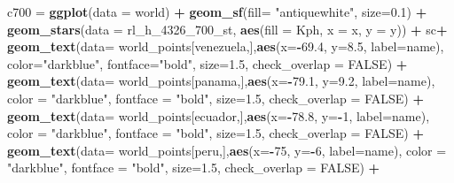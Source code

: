 \documentclass[12pt,oneside]{reedthesis}
\newenvironment{Shaded}{\begin{snugshade}}{\end{snugshade}}
\newcommand{\DataTypeTok}[1]{\textcolor[rgb]{0.13,0.29,0.53}{#1}}
\newcommand{\DecValTok}[1]{\textcolor[rgb]{0.00,0.00,0.81}{#1}}
\newcommand{\FloatTok}[1]{\textcolor[rgb]{0.00,0.00,0.81}{#1}}
\newcommand{\KeywordTok}[1]{\textcolor[rgb]{0.13,0.29,0.53}{\textbf{#1}}}
\newcommand{\NormalTok}[1]{#1}
\newcommand{\OperatorTok}[1]{\textcolor[rgb]{0.81,0.36,0.00}{\textbf{#1}}}
\newcommand{\OtherTok}[1]{\textcolor[rgb]{0.56,0.35,0.01}{#1}}
\newcommand{\StringTok}[1]{\textcolor[rgb]{0.31,0.60,0.02}{#1}}
\begin{document}
\begin{Shaded}
\begin{Highlighting}[]
\NormalTok{c700 =}\StringTok{ }\KeywordTok{ggplot}\NormalTok{(}\DataTypeTok{data =}\NormalTok{ world) }\OperatorTok{+}\StringTok{ }
\StringTok{  }\KeywordTok{geom_sf}\NormalTok{(}\DataTypeTok{fill=} \StringTok{"antiquewhite"}\NormalTok{, }\DataTypeTok{size=}\FloatTok{0.1}\NormalTok{) }\OperatorTok{+}\StringTok{ }
\StringTok{  }\KeywordTok{geom_stars}\NormalTok{(}\DataTypeTok{data =}\NormalTok{ rl_h_}\DecValTok{4326}\NormalTok{_}\DecValTok{700}\NormalTok{_st, }\KeywordTok{aes}\NormalTok{(}\DataTypeTok{fill =}\NormalTok{ Kph, }\DataTypeTok{x =}\NormalTok{ x, }\DataTypeTok{y =}\NormalTok{ y)) }\OperatorTok{+}\StringTok{ }
\StringTok{  }\NormalTok{sc}\OperatorTok{+}
\StringTok{  }\KeywordTok{geom_text}\NormalTok{(}\DataTypeTok{data=}\NormalTok{ world_points[venezuela,],}\KeywordTok{aes}\NormalTok{(}\DataTypeTok{x=}\OperatorTok{-}\FloatTok{69.4}\NormalTok{, }\DataTypeTok{y=}\FloatTok{8.5}\NormalTok{, }\DataTypeTok{label=}\NormalTok{name), }\DataTypeTok{color=}\StringTok{"darkblue"}\NormalTok{, }\DataTypeTok{fontface=}\StringTok{"bold"}\NormalTok{, }\DataTypeTok{size=}\FloatTok{1.5}\NormalTok{, }\DataTypeTok{check_overlap =} \OtherTok{FALSE}\NormalTok{) }\OperatorTok{+}
\StringTok{  }\KeywordTok{geom_text}\NormalTok{(}\DataTypeTok{data=}\NormalTok{ world_points[panama,],}\KeywordTok{aes}\NormalTok{(}\DataTypeTok{x=}\OperatorTok{-}\FloatTok{79.1}\NormalTok{, }\DataTypeTok{y=}\FloatTok{9.2}\NormalTok{, }\DataTypeTok{label=}\NormalTok{name), }\DataTypeTok{color =} \StringTok{"darkblue"}\NormalTok{, }\DataTypeTok{fontface =} \StringTok{"bold"}\NormalTok{, }\DataTypeTok{size=}\FloatTok{1.5}\NormalTok{, }\DataTypeTok{check_overlap =} \OtherTok{FALSE}\NormalTok{) }\OperatorTok{+}\StringTok{ }
\StringTok{  }\KeywordTok{geom_text}\NormalTok{(}\DataTypeTok{data=}\NormalTok{ world_points[ecuador,],}\KeywordTok{aes}\NormalTok{(}\DataTypeTok{x=}\OperatorTok{-}\FloatTok{78.8}\NormalTok{, }\DataTypeTok{y=}\OperatorTok{-}\DecValTok{1}\NormalTok{, }\DataTypeTok{label=}\NormalTok{name), }\DataTypeTok{color =} \StringTok{"darkblue"}\NormalTok{, }\DataTypeTok{fontface =} \StringTok{"bold"}\NormalTok{, }\DataTypeTok{size=}\FloatTok{1.5}\NormalTok{, }\DataTypeTok{check_overlap =} \OtherTok{FALSE}\NormalTok{) }\OperatorTok{+}
\StringTok{  }\KeywordTok{geom_text}\NormalTok{(}\DataTypeTok{data=}\NormalTok{ world_points[peru,],}\KeywordTok{aes}\NormalTok{(}\DataTypeTok{x=}\OperatorTok{-}\DecValTok{75}\NormalTok{, }\DataTypeTok{y=}\OperatorTok{-}\DecValTok{6}\NormalTok{, }\DataTypeTok{label=}\NormalTok{name), }\DataTypeTok{color =} \StringTok{"darkblue"}\NormalTok{, }\DataTypeTok{fontface =} \StringTok{"bold"}\NormalTok{, }\DataTypeTok{size=}\FloatTok{1.5}\NormalTok{, }\DataTypeTok{check_overlap =} \OtherTok{FALSE}\NormalTok{) }\OperatorTok{+}

\end{Highlighting}
\end{Shaded}
\end{document}
